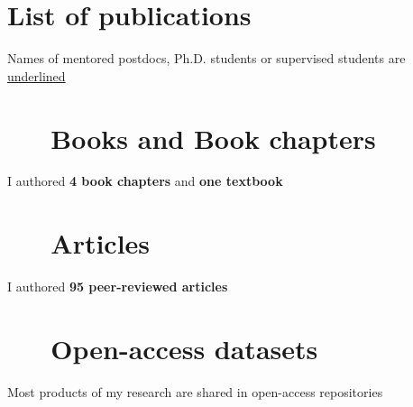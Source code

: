 \documentclass[%
               doublesided,
               paper=a4,
               fontsize=10pt
              ]{my-resume}
\begin{document}
\clearpage

\pagestyle{empty}

\section[\faAreaChart]{List of publications}
Names of mentored postdocs, Ph.D. students or supervised students are \underline{underlined}

\nocite{*}
\section{\faBook \ \ \ Books and Book chapters}
I authored \textbf{4 book chapters} and \textbf{one textbook}
\printbibliography[type=book,heading=none]
\section{\faFileTextO \ \ \  Articles}
I authored \textbf{95 peer-reviewed articles}
\printbibliography[type=article,heading=none]
\section{\faFileTextO \ \ \  Open-access datasets}
Most products of my research are shared in open-access repositories
\printbibliography[type=dataset,heading=none]


\end{document}
